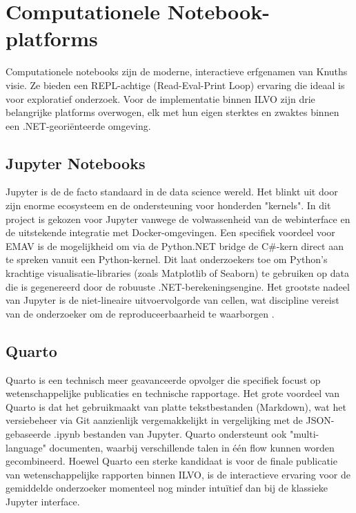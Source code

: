 \section{Computationele Notebook-platforms}
Computationele notebooks zijn de moderne, interactieve erfgenamen van Knuths visie. Ze bieden een REPL-achtige (Read-Eval-Print Loop) ervaring die ideaal is voor exploratief onderzoek. Voor de implementatie binnen ILVO zijn drie belangrijke platforms overwogen, elk met hun eigen sterktes en zwaktes binnen een .NET-georiënteerde omgeving.

\subsection{Jupyter Notebooks}
Jupyter \autocite{jupyternotebook} is de de facto standaard in de data science wereld. Het blinkt uit door zijn enorme ecosysteem en de ondersteuning voor honderden "kernels". In dit project is gekozen voor Jupyter vanwege de volwassenheid van de webinterface en de uitstekende integratie met Docker-omgevingen. 
Een specifiek voordeel voor EMAV is de mogelijkheid om via de Python.NET bridge de C\#-kern direct aan te spreken vanuit een Python-kernel. Dit laat onderzoekers toe om Python's krachtige visualisatie-libraries (zoals Matplotlib of Seaborn) te gebruiken op data die is gegenereerd door de robuuste .NET-berekeningsengine. Het grootste nadeel van Jupyter is de niet-lineaire uitvoervolgorde van cellen, wat discipline vereist van de onderzoeker om de reproduceerbaarheid te waarborgen \autocite{Rule2018}.

\subsection{Quarto}
Quarto \autocite{quarto2025} is een technisch meer geavanceerde opvolger die specifiek focust op wetenschappelijke publicaties en technische rapportage. Het grote voordeel van Quarto is dat het gebruikmaakt van platte tekstbestanden (Markdown), wat het versiebeheer via Git aanzienlijk vergemakkelijkt in vergelijking met de JSON-gebaseerde .ipynb bestanden van Jupyter. Quarto ondersteunt ook "multi-language" documenten, waarbij verschillende talen in één flow kunnen worden gecombineerd. Hoewel Quarto een sterke kandidaat is voor de finale publicatie van wetenschappelijke rapporten binnen ILVO, is de interactieve ervaring voor de gemiddelde onderzoeker momenteel nog minder intuïtief dan bij de klassieke Jupyter interface.

